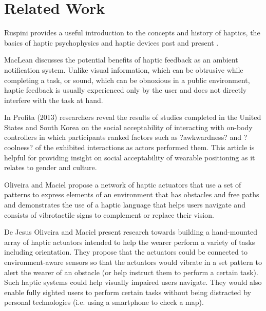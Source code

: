 \documentclass{chi-ext}
\begin{document}
\section{Related Work}

Ruspini provides a useful introduction to the concepts and history of haptics, the basics of haptic psychophysics and haptic devices past and present \cite{ruspini1999haptics}.

MacLean \cite{maclean2009putting} discusses the potential benefits of haptic feedback as an ambient notification system. Unlike visual information, which can be obtrusive while completing a task, or sound, which can be obnoxious in a public environment, haptic feedback is usually experienced only by the user and does not directly interfere with the task at hand. 

In Profita (2013) \cite{profita2013don} researchers reveal the results of studies completed in the United States and South Korea on the social acceptability of interacting with on-body controllers in which participants  ranked factors such as ?awkwardness? and ?coolness? of the exhibited interactions as actors performed them. This article is helpful for providing insight on social acceptability of wearable positioning as it relates to gender and culture.

Oliveira and Maciel propose a network of haptic actuators that use a set of patterns to express elements of an environment that has obstacles and free paths and demonstrates the use of a haptic language that helps users navigate and consists of vibrotactile signs to complement or replace their vision. \cite{Jesus-Oliveira:2013aa}

De Jesus Oliveira and Maciel \cite{Jesus-Oliveira:2013aa} present research towards building a hand-mounted array of haptic actuators intended to help the wearer perform a variety of tasks including orientation. They propose that the actuators could be connected to environment-aware sensors so that the actuators would vibrate in a set pattern to alert the wearer of an obstacle (or help instruct them to perform a certain task). Such haptic systems could help visually impaired users navigate. They would also enable fully sighted users to perform certain tasks without being distracted by personal technologies (i.e. using a smartphone to check a map).


\end{document}
